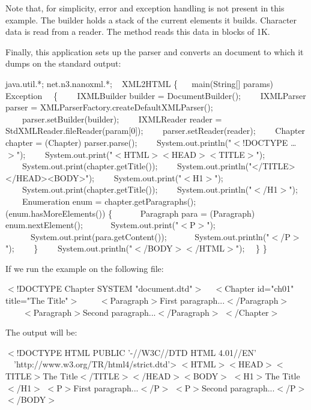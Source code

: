 Note that, for simplicity, error and exception handling is not present in this example.
The builder holds a stack of the current elements it builds.
Character data is read from a reader.
The method  reads this data in blocks of 1K.

Finally, this application sets up the \NanoXML{} parser and converts an \XML{} document to  which it dumps on the standard output:

\begin{example}
 java.util.*;
 net.n3.nanoxml.*;
~
 XML2HTML
\{
~~ main(String[] params)
~~~~ Exception
~~\{
~~~~IXMLBuilder builder =  DocumentBuilder();
~~~~IXMLParser parser = XMLParserFactory.createDefaultXMLParser();
~~~~parser.setBuilder(builder);
~~~~IXMLReader reader = StdXMLReader.fileReader(param[0]);
~~~~parser.setReader(reader);
~~~~Chapter chapter = (Chapter) parser.parse();
~~~~System.out.println("$<$!DOCTYPE \ldots{} $>$");
~~~~System.out.print("$<$HTML$><$HEAD$><$TITLE$>$");
~~~~System.out.print(chapter.getTitle());
~~~~System.out.println("</TITLE></HEAD><BODY>");
~~~~System.out.print("$<$H1$>$");
~~~~System.out.print(chapter.getTitle());
~~~~System.out.println("$<$/H1$>$");
~~~~Enumeration enum = chapter.getParagraphs();
~~~~ (enum.hasMoreElements()) \{
~~~~~~Paragraph para = (Paragraph) enum.nextElement();
~~~~~~System.out.print("$<$P$>$");
~~~~~~System.out.print(para.getContent());
~~~~~~System.out.println("$<$/P$>$");
~~~~\}
~~~~System.out.println("$<$/BODY$><$/HTML$>$");
~~\}
\}
\end{example}

If we run the example on the following \XML{} file:

\begin{example}
$<$!DOCTYPE Chapter SYSTEM "document.dtd"$>$
~
$<$Chapter id="ch01" title="The Title"$>$
~~~~$<$Paragraph$>$First paragraph...$<$/Paragraph$>$
~~~~$<$Paragraph$>$Second paragraph...$<$/Paragraph$>$
$<$/Chapter$>$
\end{example}

The output will be:

\begin{example}
$<$!DOCTYPE HTML PUBLIC '-//W3C//DTD HTML 4.01//EN'
~~'http://www.w3.org/TR/html4/strict.dtd'>
$<$HTML$><$HEAD$><$TITLE$>$The Title$<$/TITLE$><$/HEAD$><$BODY$>$
$<$H1$>$The Title$<$/H1$>$
$<$P$>$First paragraph...$<$/P$>$
$<$P$>$Second paragraph...$<$/P$>$
$<$/BODY$>$
\end{example}
